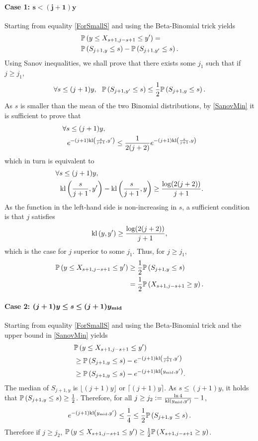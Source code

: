 \paragraph{Case 1: $\bm{s < (j+1)y}$} Starting from equality \eqref{ForSmallS} and using the Beta-Binomial trick yields  
\begin{align*}
&\mathbb{P}\left(y \leq X_{s+1,j-s+1} \leq y'\right) =
\\
&\mathbb{P}\left(S_{j+1,y} \leq s\right) - \mathbb{P}\left(S_{j+1,y'} \leq s\right).
\end{align*}
Using Sanov inequalities, we shall prove that there exists some $j_1$ such that if $j\geq j_1$, 
\[\forall s \leq (j+1)y, \ \ \bP\left(S_{j+1,y'} \leq s\right) \leq \frac{1}{2}\bP\left(S_{j+1,y} \leq s\right).\]
As $s$ is smaller than the mean of the two Binomial distributions, by \eqref{SanovMin} it is sufficient to prove that 
\begin{align*}
&\forall s \leq (j+1)y,
\\&
\ \ e^{-(j+1)\mathrm{kl}\left(\frac{s}{j+1} , y'\right)} \leq \frac{1}{2(j+2)}e^{-(j+1)\mathrm{kl}\left(\frac{s}{j+1} , y\right)}
\end{align*}
which in turn is equivalent to 
\begin{align*}
&\forall s \leq (j+1)y,
\\ &
\ \ \mathrm{kl}\left(\frac{s}{j+1} , y'\right)  -  \mathrm{kl}\left(\frac{s}{j+1} , y\right) \geq \frac{\log(2(j+2))}{j+1}.
\end{align*}
As the function in the left-hand side is non-increasing in $s$, a sufficient condition is that $j$ satisfies 
\[ \mathrm{kl}\left(y , y'\right)\geq \frac{\log(2(j+2))}{j+1},\]
which is the case for $j$ superior to some $j_1$. Thus, for $j\geq j_1$, 
\begin{align*}
\mathbb{P}\left(y \leq X_{s+1,j-s+1} \leq y'\right)
&\geq \frac{1}{2}\mathbb{P}\left(S_{j+1,y} \leq s\right)
\\
&= \frac{1}{2}\mathbb{P}\left(X_{s+1,j-s+1} \geq y\right).
\end{align*}

\paragraph{Case 2: $\bm{(j+1)y \leq s \leq (j+1)y_{\mathrm{mid}}}$} Starting from equality \eqref{ForSmallS} and using the Beta-Binomial trick and the upper bound in \eqref{SanovMin} yields 
\begin{align*}
&\mathbb{P}\left(y \leq X_{s+1,j-s+1} \leq y'\right) 
\\ & \geq \mathbb{P}\left(S_{j+1,y} \leq s\right) - e^{-(j+1)\mathrm{kl}\left(\frac{s}{j+1} , y'\right)}
\\ & \geq \mathbb{P}\left(S_{j+1,y} \leq s\right) - e^{-(j+1)\mathrm{kl}\left(y_{\mathrm{mid}} , y'\right)}. 
\end{align*}
The median of $S_{j+1,y}$ is $\lfloor(j+1)y\rfloor$ or $\lceil(j+1)y\rceil$. As $s \leq  (j+1)y$, it holds that $\mathbb{P}\left(S_{j+1,y} \leq s\right) \geq \frac{1}{2}$. Therefore, for all $j \geq j_2 := \frac{\ln 4}{\mathrm{kl}(y_{\mathrm{mid}},y')}-1$, 
\[e^{-(j+1)\mathrm{kl}\left(y_{\mathrm{mid}} , y'\right)} \leq \frac{1}{4} \leq \frac{1}{2}\mathbb{P}\left(S_{j+1,y} \leq s\right).\]
Therefore if $j \geq j_2$, $\mathbb{P}\left(y \leq X_{s+1,j-s+1} \leq y'\right)  \geq \frac{1}{2}\mathbb{P}\left(X_{s+1,j-s+1} \geq y\right)$.

